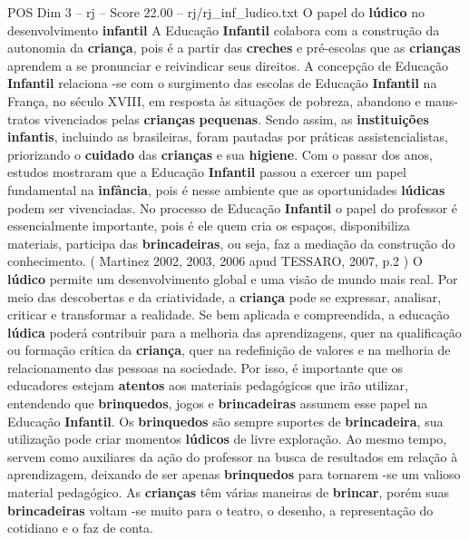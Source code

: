 \begin{textsample}{POS Dim 3 – rj – Score 22.00 – rj/rj\_inf\_ludico.txt}  \label{ex:f3_pos_008}
O papel do \textbf{lúdico} no desenvolvimento \textbf{infantil} A Educação \textbf{Infantil} colabora com a construção da autonomia da \textbf{criança}, pois é a partir das \textbf{creches} e pré-escolas que as \textbf{crianças} aprendem a se pronunciar e reivindicar seus direitos.
A concepção de Educação \textbf{Infantil} relaciona -se com o surgimento das escolas de Educação \textbf{Infantil} na França, no século XVIII, em resposta às situações de pobreza, abandono e maus-tratos vivenciados pelas \textbf{crianças} \textbf{pequenas}.
Sendo assim, as \textbf{instituições} \textbf{infantis}, incluindo as brasileiras, foram pautadas por práticas assistencialistas, priorizando o \textbf{cuidado} das \textbf{crianças} e sua \textbf{higiene}.
Com o passar dos anos, estudos mostraram que a Educação \textbf{Infantil} passou a exercer um papel fundamental na \textbf{infância}, pois é nesse ambiente que as oportunidades \textbf{lúdicas} podem ser vivenciadas.
No processo de Educação \textbf{Infantil} o papel do professor é essencialmente importante, pois é ele quem cria os espaços, disponibiliza materiais, participa das \textbf{brincadeiras}, ou seja, faz a mediação da construção do conhecimento. ( Martinez 2002, 2003, 2006 apud TESSARO, 2007, p.2 ) O \textbf{lúdico} permite um desenvolvimento global e uma visão de mundo mais real.
Por meio das descobertas e da criatividade, a \textbf{criança} pode se expressar, analisar, criticar e transformar a realidade.
Se bem aplicada e compreendida, a educação \textbf{lúdica} poderá contribuir para a melhoria das aprendizagens, quer na qualificação ou formação crítica da \textbf{criança}, quer na redefinição de valores e na melhoria de relacionamento das pessoas na sociedade.
Por isso, é importante que os educadores estejam \textbf{atentos} aos materiais pedagógicos que irão utilizar, entendendo que \textbf{brinquedos}, jogos e \textbf{brincadeiras} assumem esse papel na Educação \textbf{Infantil}.
Os \textbf{brinquedos} são sempre suportes de \textbf{brincadeira}, sua utilização pode criar momentos \textbf{lúdicos} de livre exploração.
Ao mesmo tempo, servem como auxiliares da ação do professor na busca de resultados em relação à aprendizagem, deixando de ser apenas \textbf{brinquedos} para tornarem -se um valioso material pedagógico.
As \textbf{crianças} têm várias maneiras de \textbf{brincar}, porém suas \textbf{brincadeiras} voltam -se muito para o teatro, o desenho, a representação do cotidiano e o faz de conta.

\end{textsample}
